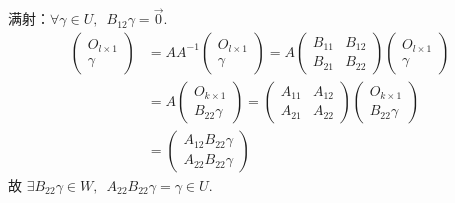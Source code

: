 \begin{enumerate}
          满射：$ \forall \gamma \in U,\enspace B_{12} \gamma = \vec{0} $.
          \begin{align*}
              \begin{pmatrix} O_{l \times 1} \\ \gamma \end{pmatrix}
               & = A A^{-1} \begin{pmatrix} O_{l \times 1} \\ \gamma \end{pmatrix} = A \begin{pmatrix} B_{11} & B_{12} \\ B_{21} & B_{22} \end{pmatrix} \begin{pmatrix} O_{l \times 1} \\ \gamma \end{pmatrix}      \\
               & = A \begin{pmatrix} O_{k \times 1} \\ B_{22} \gamma \end{pmatrix} = \begin{pmatrix} A_{11} & A_{12} \\ A_{21} & A_{22} \end{pmatrix} \begin{pmatrix} O_{k \times 1} \\ B_{22} \gamma \end{pmatrix} \\
               & = \begin{pmatrix} A_{12} B_{22} \gamma \\ A_{22} B_{22} \gamma \end{pmatrix}
          \end{align*}
          故 $ \exists B_{22} \gamma \in W,\enspace A_{22} B_{22} \gamma = \gamma \in U $.
\end{enumerate}

\clearpage
